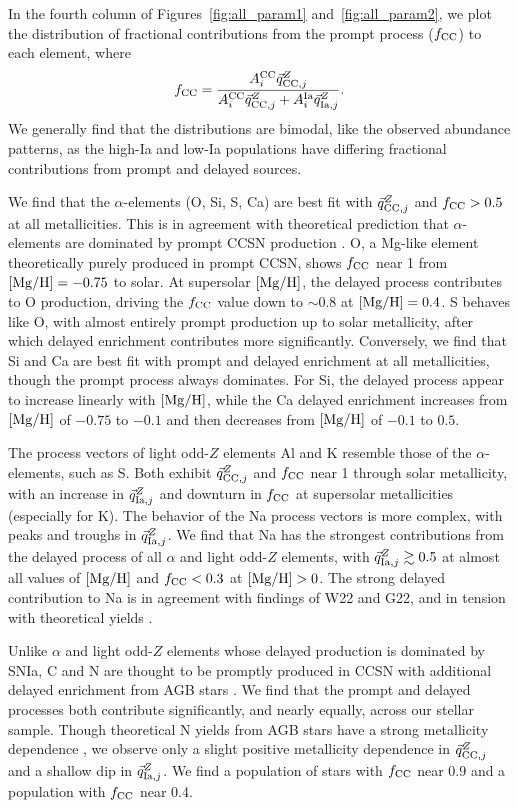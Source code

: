 \documentclass[modern]{aastex631}
\newcommand{\mgh}{[{\rm Mg}/{\rm H}]}
\newcommand{\qcc}{\vec{q}_{{\rm CC,}j}^{Z}}
\newcommand{\qIa}{\vec{q}_{{\rm Ia,}j}^{Z}}
\newcommand{\Acc}{A^{\rm CC}_{i}}
\newcommand{\AIa}{A^{\rm Ia}_{i}}
\newcommand{\fcc}{f_{\rm CC}}
\begin{document}
In the fourth column of Figures~\ref{fig:all_param1} and~\ref{fig:all_param2}, we plot the distribution of fractional contributions from the prompt process ($\fcc$) to each element, where
\begin{equation}\label{eq:fcc}
    \fcc = \frac{\Acc\qcc}{\Acc\qcc + \AIa\qIa}.
\end{equation}
We generally find that the distributions are bimodal, like the observed abundance patterns, as the high-Ia and low-Ia populations have differing fractional contributions from prompt and delayed sources.

We find that the $\alpha$-elements (O, Si, S, Ca) are best fit with $\qcc$ and $\fcc > 0.5$ at all metallicities. This is in agreement with theoretical prediction that $\alpha$-elements are dominated by prompt CCSN production \citep[e.g.][]{andrews2017}. O, a Mg-like element theoretically purely produced in prompt CCSN, shows $\fcc$ near 1 from $\mgh=-0.75$ to solar. At supersolar $\mgh$, the delayed process contributes to O production, driving the $\fcc$ value down to $\sim 0.8$ at $\mgh=0.4$. S behaves like O, with almost entirely prompt production up to solar metallicity, after which delayed enrichment contributes more significantly. Conversely, we find that Si and Ca are best fit with prompt and delayed enrichment at all metallicities, though the prompt process always dominates. For Si, the delayed process appear to increase linearly with $\mgh$, while the Ca delayed enrichment increases from $\mgh$ of $-0.75$ to $-0.1$ and then decreases from $\mgh$ of $-0.1$ to $0.5$.

The process vectors of light odd-$Z$ elements Al and K resemble those of the $\alpha$-elements, such as S. Both exhibit $\qcc$ and $\fcc$ near 1 through solar metallicity, with an increase in $\qIa$ and downturn in $\fcc$ at supersolar metallicities (especially for K). The behavior of the Na process vectors is more complex, with peaks and troughs in $\qIa$. We find that Na has the strongest contributions from the delayed process of all $\alpha$ and light odd-$Z$ elements, with $\qIa \gtrsim 0.5$ at almost all values of $\mgh$ and $\fcc < 0.3$ at $\mgh > 0$. The strong delayed contribution to Na is in agreement with findings of W22 and G22, and in tension with theoretical yields \citep[e.g.][]{andrews2017, rybizki2017}.

Unlike $\alpha$ and light odd-$Z$ elements whose delayed production is dominated by SNIa, C and N are thought to be promptly produced in CCSN with additional delayed enrichment from AGB stars \citep[e.g.][]{andrews2017}. We find that the prompt and delayed processes both contribute significantly, and nearly equally, across our stellar sample. Though theoretical N yields from AGB stars have a strong metallicity dependence \citep{karakas2010, ventura2013, cristallo2015, johnson2022}, we observe only a slight positive metallicity dependence in $\qcc$ and a shallow dip in $\qIa$. We find a population of stars with $\fcc$ near 0.9 and a population with $\fcc$ near 0.4. 
\end{document}
